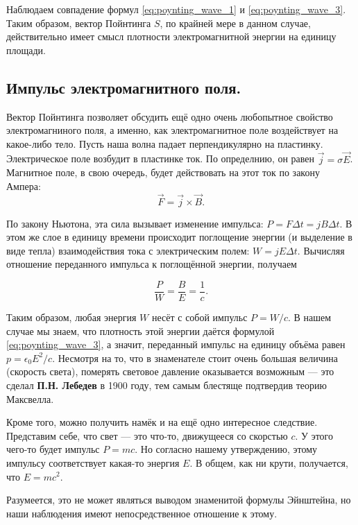 \documentclass[11pt,a4paper]{article}
\numberwithin{equation}{section}
\newcommand{\eps}{\epsilon}
\begin{document}
Наблюдаем совпадение формул \eqref{eq:poynting_wave_1} и
\eqref{eq:poynting_wave_3}. Таким образом, вектор Пойнтинга $S$, по
крайней мере в данном случае, действительно имеет смысл плотности
электромагнитной энергии на единицу площади. 

\subsection{Импульс электромагнитного поля. }
\label{sec:field_momentum}

Вектор Пойнтинга позволяет обсудить ещё одно очень любопытное свойство
электромагниного поля, а именно, как электромагнитное поле
воздействует на какое-либо тело. Пусть наша волна падает
перпендикулярно на пластинку. Электрическое поле возбудит в пластинке
ток. По определнию, он равен $\vec{j} = \sigma \vec{E}$. Магнитное
поле, в свою очередь, будет действовать на этот ток по закону Ампера: 
\begin{equation}
  \label{eq:momentum_1}
  \vec{F} = \vec{j} \times \vec{B}.
\end{equation}

По закону Ньютона, эта сила вызывает изменение импульса: $P = F \Delta
t = j B \Delta t$. В этом же слое в единицу времени происходит
поглощение энергии (и выделение в виде тепла) взаимодействия тока с
электрическим полем: $W = j E \Delta t$. Вычисляя отношение
переданного импульса к поглощённой энергии, получаем

\begin{equation}
  \label{eq:momentum_2}
  \frac{P}{W}= \frac{B}{E} = \frac{1}{c}.
\end{equation}

Таким образом, любая энергия $W$ несёт с собой импульс $P=W/c$. В
нашем случае мы знаем, что плотность этой энергии даётся формулой
\eqref{eq:poynting_wave_3}, а значит, переданный импульс на единицу
объёма равен $p=\eps_0 E^2/c$. Несмотря на то, что в знаменателе стоит
очень большая величина (скорость света), померять световое давление
оказывается возможным --- это сделал \textbf{П.Н. Лебедев} в 1900
году, тем самым блестяще подтвердив теорию Максвелла. 

Кроме того, можно получить намёк и на ещё одно интересное
следствие. Представим себе, что свет --- это что-то, движущееся со
скорстью $c$. У этого чего-то будет импульс $P=mc$. Но согласно нашему
утверждению, этому импульсу соответствует какая-то энергия $E$. В
общем, как ни крути, получается, что $E=mc^2$.

Разумеется, это не может являться выводом знаменитой формулы
Эйнштейна, но наши наблюдения имеют непосредственное отношение к этому.
\end{document}
